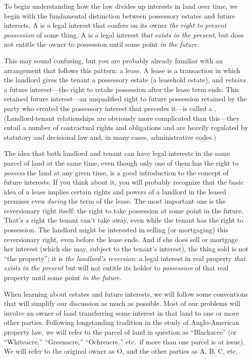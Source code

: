 To begin understanding how the law divides up interests in land over time, we
begin with the fundamental distinction between possessory
estates and future interests. A 
is a legal interest that confers on its owner \textit{the right to
present possession} of some thing. A  is a legal
interest \textit{that exists in the present}, but does not entitle the
owner to possession until some point \textit{in the future}.

This may sound confusing, but you are probably already familiar with an
arrangement that follows this pattern: a lease. A lease is a transaction in
which the landlord gives the tenant a possessory estate (a leasehold estate),
and \textit{retains} a future interest---the right to retake possession after
the lease term ends. This retained future interest---an unqualified right to
future possession retained by the party who created the possessory interest
that precedes it---is called a . (Landlord-tenant
relationships are obviously more complicated than this---they entail a number
of contractual rights and obligations and are heavily regulated by statutory
and decisional law and, in many cases, administrative codes.)

The idea that both landlord and tenant can have legal interests in the same
parcel of land at the same time, even though only one of them has the right to
\textit{possess} the land at any given time, is a good introduction to the
concept of future interests. If you think about it, you will probably recognize
that the basic idea of a lease implies certain rights and powers of a landlord
in the leased premises even \textit{during} the term of the lease. The most
important one is the reversionary right itself: the right to take possession at
some point in the future. That's a right the tenant can't take away, even while
the tenant has the right to possession. The landlord might be interested in
selling (or mortgaging) this reversionary right, even before the lease ends.
And if she does sell or mortgage her interest (which she may, subject to the
tenant's interest), the thing sold is not ``the property''; it is \textit{the
landlord's reversion}: a legal interest in real property \textit{that exists in
the present} but will not entitle its holder to \textit{possession} of that
real property until some point \textit{in the future}.

When learning about estates and future interests, we will follow some
conventions that will simplify our discussion as much as possible. Most of our
problems will involve an owner of land transferring some interest in that land
to one or more other parties. Following longstanding tradition in the study of
Anglo-American property law, we will refer to the parcel of land in question as
``Blackacre'' (or ``Whiteacre,'' ``Greenacre,'' ``Ochreacre,'' etc.\ if more
than one parcel is at issue). We will refer to the original owner as O, and the
other parties as A, B, C, etc.




